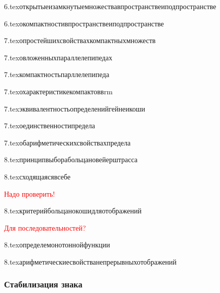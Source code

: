 {6.tex}{открытыеизамкнутыемножествавпространствеиподпространстве}

{6.tex}{окомпактностивпространствеиподпространстве}

{7.tex}{опростейшихсвойствахкомпактныхмножеств}

{7.tex}{овложенныхпараллелепипедах}

{7.tex}{компактностьпарллелепипеда}

{7.tex}{охарактеристикекомпактоввrm}

{7.tex}{эквивалентностьопределенийгейнеикоши}

{7.tex}{оединственностипредела}



{7.tex}{обарифметическихсвойствахпредела}

{8.tex}{принципвыборабольцановейерштрасса}

{8.tex}{сходящаясявсебе}

\textcolor{red}{Надо проверить!}


{8.tex}{критерийбольцанокошидляотображений}

\textcolor{red}{Для последовательностей?}

{8.tex}{определемонотоннойфункции}

{8.tex}{арифметическиесвойстванепрерывныхотображений}

\subsubsection{Стабилизация знака}

